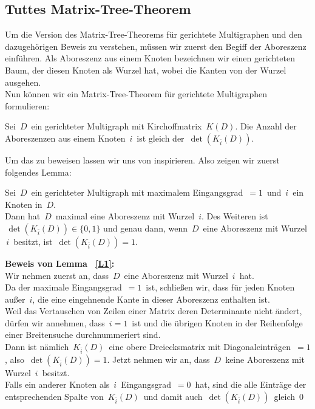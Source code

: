 \subsection{Tuttes Matrix-Tree-Theorem}
Um die Version des Matrix-Tree-Theorems für gerichtete Multigraphen und den dazugehörigen Beweis zu verstehen, müssen wir zuerst den Begiff der Aboreszenz einführen.
Als Aboreszenz aus einem Knoten bezeichnen wir einen gerichteten Baum, der diesen Knoten als Wurzel hat, wobei die Kanten von der Wurzel ausgehen.\\
Nun können wir ein Matrix-Tree-Theorem für gerichtete Multigraphen formulieren:
\begin{Tms}
\sloppypar
Sei $\,D\,$ ein gerichteter Multigraph mit Kirchoffmatrix $\,K(D)$.\;  Die Anzahl der Aboreszenzen aus einem Knoten $\,i\,$ ist gleich der $\,\det(K_{\bar{i}}(D))$.\; 
\par
\end{Tms}
Um das zu beweisen lassen wir uns von \cite{bang-jensen_2009} inspirieren.
Also zeigen wir zuerst folgendes Lemma:
\begin{Lms}
Sei $\,D\,$ ein gerichteter Multigraph mit maximalem Eingangsgrad $\,=1\,$ und $\,i\,$ ein Knoten in $\,D$.\; \\
Dann hat $\,D\,$ maximal eine Aboreszenz mit Wurzel $\,i$.\; Des Weiteren ist $\,\det(K_{\bar{i}}(D)) \in \{0,1\}$
und genau dann, wenn $\,D\,$ eine Aboreszenz mit Wurzel $\,i\,$ besitzt, ist $\,\det(K_{\bar{i}}(D)) = 1$.\; 
\label{L1}
\end{Lms}
\textbf{Beweis von Lemma ~\ref{L1}:}\\
Wir nehmen zuerst an, dass $\,D\,$ eine Aboreszenz mit Wurzel $\,i\,$ hat.\\
Da der maximale Eingangsgrad $\,=1\,$ ist, schließen wir, dass für jeden Knoten außer $\,i$,\; die eine eingehnende Kante in dieser Aboreszenz enthalten ist. \\
Weil das Vertauschen von Zeilen einer Matrix deren Determinante nicht ändert, dürfen wir annehmen, dass $\,i=1\,$ ist und die übrigen Knoten in der Reihenfolge einer Breitensuche durchnummeriert sind.\\ 
Dann ist nämlich $\,K_{\bar{i}}(D)\,$ eine obere Dreiecksmatrix mit Diagonaleinträgen $\,=1$,\; also $\,\det(K_{\bar{i}}(D)) = 1$.\; 
Jetzt nehmen wir an, dass $\,D\,$ keine Aboreszenz mit Wurzel $\,i\,$ besitzt.\\
Falls ein anderer Knoten als $\,i\,$ Eingangsgrad $\,=0\,$ hat, sind die alle Einträge der entsprechenden Spalte von $\,K_{\bar{i}}(D)\,$ und damit auch $\,\det(K_{\bar{i}}(D))\,$ gleich $\,0$\\
